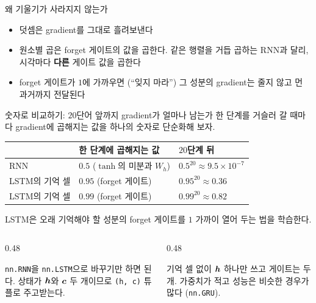 \documentclass[aspectratio=169,11pt]{beamer}
\begin{document}
\begin{frame}{왜 기울기가 사라지지 않는가}
\vskip1mm
\begin{itemize}
\item 덧셈은 gradient를 그대로 흘려보낸다
\item 원소별 곱은 forget 게이트의 값을 곱한다.
같은 행렬을 거듭 곱하는 RNN과 달리, 시각마다 \textbf{다른} 게이트 값을 곱한다
\item forget 게이트가 $1$에 가까우면 (``잊지 마라'') 그 성분의 gradient는 줄지 않고 먼 과거까지 전달된다
\end{itemize}
\end{frame}

\begin{frame}{숫자로 비교하기: $20$단어 앞까지 gradient가 얼마나 남는가}
한 단계를 거슬러 갈 때마다 gradient에 곱해지는 값을 하나의 숫자로 단순화해 보자.
\vskip2mm
\centering
\begin{tabular}{@{}lll@{}}
\toprule
& 한 단계에 곱해지는 값 & $20$단계 뒤 \\
\midrule
RNN & $0.5$ ($\tanh$의 미분과 $W_h$) & $0.5^{20}\approx9.5\times10^{-7}$ \\
LSTM의 기억 셀 & $0.95$ (forget 게이트) & $0.95^{20}\approx0.36$ \\
LSTM의 기억 셀 & $0.99$ (forget 게이트) & $0.99^{20}\approx0.82$ \\
\bottomrule
\end{tabular}
\vskip2mm
\raggedright
LSTM은 오래 기억해야 할 성분의 forget 게이트를 $1$ 가까이 열어 두는 법을 학습한다.
\vskip2mm
\begin{columns}[T,onlytextwidth]
\begin{column}{0.48\textwidth}
\begin{keybox}[PyTorch]
\texttt{nn.RNN}을 \texttt{nn.LSTM}으로 바꾸기만 하면 된다.
상태가 $\bm{h}$와 $\bm{c}$ 두 개이므로 \texttt{(h, c)} 튜플로 주고받는다.
\end{keybox}
\end{column}
\begin{column}{0.48\textwidth}
\begin{remarkbox}[GRU]
기억 셀 없이 $\bm{h}$ 하나만 쓰고 게이트는 두 개.
가중치가 적고 성능은 비슷한 경우가 많다 (\texttt{nn.GRU}).
\end{remarkbox}
\end{column}
\end{columns}
\end{frame}
\end{document}
